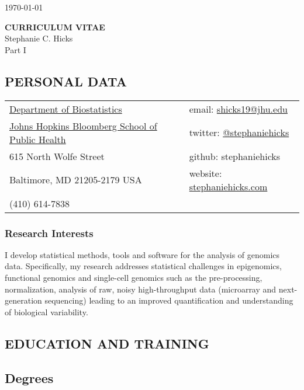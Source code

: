 \documentclass[10pt]{article}
\begin{document}
\hfill \today

\begin{center}
{\bf CURRICULUM VITAE}\\
Stephanie C. Hicks\\[3mm]
Part I
\end{center}

\vspace*{10mm}

\subsection*{PERSONAL DATA}

%
\begin{tabular}[t]{L{12.5cm}R{5cm}}
\href{https://www.jhsph.edu/departments/biostatistics/}{Department of Biostatistics} & email: \href{mailto:shicks19@jhu.edu}{shicks19@jhu.edu} \\
\href{https://www.jhsph.edu}{Johns Hopkins Bloomberg School of Public Health} & twitter: \href{https://twitter.com/stephaniehicks}{@stephaniehicks} \\
615 North Wolfe Street  &  github: stephaniehicks \\
Baltimore, MD 21205-2179 USA & website: \href{http://www.stephaniehicks.com}{stephaniehicks.com} \\ 
(410) 614-7838  & 
\end{tabular}

\subsubsection*{Research Interests}

I develop statistical methods, tools and software for the analysis of genomics data. Specifically, my research addresses statistical challenges in epigenomics, functional genomics and single-cell genomics such as the pre-processing, normalization, analysis of raw, noisy high-throughput data (microarray and next-generation sequencing) leading to an improved quantification and understanding of biological variability.


\subsection*{EDUCATION AND TRAINING}

\smallskip

\subsection*{Degrees}
\end{document}
